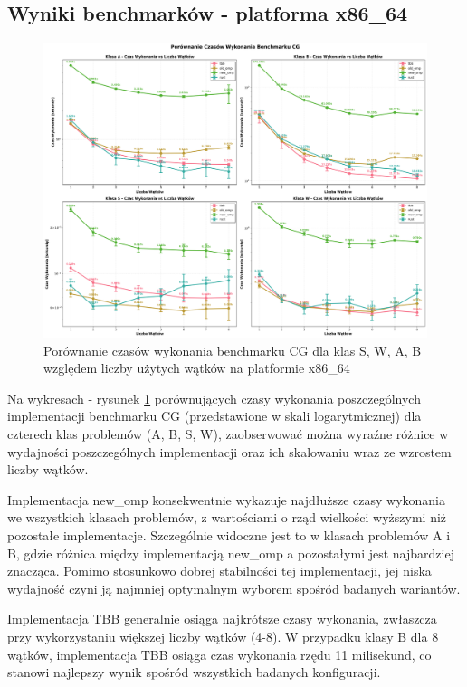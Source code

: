 \subsection{Wyniki benchmarków - platforma x86\_64}
\begin{figure}[H]
    \centering
    \includegraphics[width=\textwidth]{analiza/images/parallel/cg/x86/cg_porownanie_czasow_wykonania.png}
    \caption{Porównanie czasów wykonania benchmarku CG dla klas S, W, A, B względem liczby użytych wątków na platformie x86\_64}
    \label{cg_porownanie_czasow_wykonania_x86_64}
\end{figure}
Na wykresach - rysunek \ref{cg_porownanie_czasow_wykonania_x86_64} porównujących czasy wykonania poszczególnych implementacji benchmarku CG (przedstawione w skali logarytmicznej) dla czterech klas problemów (A, B, S, W), zaobserwować można wyraźne różnice w wydajności poszczególnych implementacji oraz ich skalowaniu wraz ze wzrostem liczby wątków.

Implementacja new\_omp konsekwentnie wykazuje najdłuższe czasy wykonania we wszystkich klasach problemów, z wartościami o rząd wielkości wyższymi niż pozostałe implementacje. Szczególnie widoczne jest to w klasach problemów A i B, gdzie różnica między implementacją new\_omp a pozostałymi jest najbardziej znacząca. Pomimo stosunkowo dobrej stabilności tej implementacji, jej niska wydajność czyni ją najmniej optymalnym wyborem spośród badanych wariantów.

Implementacja TBB generalnie osiąga najkrótsze czasy wykonania, zwłaszcza przy wykorzystaniu większej liczby wątków (4-8). W przypadku klasy B dla 8 wątków, implementacja TBB osiąga czas wykonania rzędu 11 milisekund, co stanowi najlepszy wynik spośród wszystkich badanych konfiguracji.

